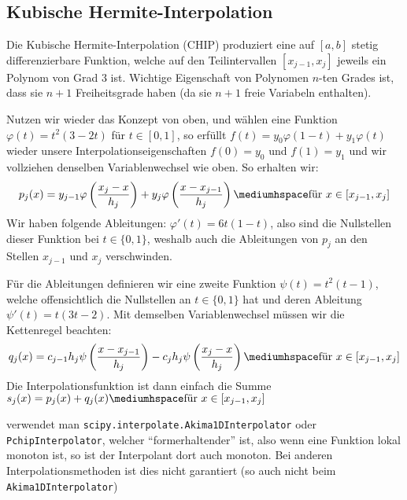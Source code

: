 
\subsection{Kubische Hermite-Interpolation}
Die Kubische Hermite-Interpolation (CHIP) produziert eine auf $[a, b]$ stetig differenzierbare Funktion, welche auf den Teilintervallen $[x_{j - 1}, x_j]$ jeweils ein Polynom von Grad 3 ist.
Wichtige Eigenschaft von Polynomen $n$-ten Grades ist, dass sie $n + 1$ Freiheitsgrade haben (da sie $n + 1$ freie Variabeln enthalten).

Nutzen wir wieder das Konzept von oben, und wählen eine Funktion $\varphi(t) = t^2(3 - 2t)$ für $t \in [0, 1]$,
so erfüllt $f(t) = y_0\varphi(1 - t) + y_1 \varphi(t)$ wieder unsere Interpolationseigenschaften $f(0) = y_0$ und $f(1) = y_1$ und wir vollziehen denselben Variablenwechsel wie oben.
So erhalten wir:
\begin{align*}
    p_j(x) = y_{j - 1} \varphi \left( \frac{x_j - x}{h_j} \right) + y_j \varphi \left( \frac{x - x_{j - 1}}{h_j} \right) \mediumhspace \text{für } x \in [x_{j - 1}, x_j]
\end{align*}
Wir haben folgende Ableitungen: $\varphi'(t) = 6t(1 - t)$, also sind die Nullstellen dieser Funktion bei $t \in \{ 0, 1 \}$,
weshalb auch die Ableitungen von $p_j$ an den Stellen $x_{j - 1}$ und $x_j$ verschwinden.

Für die Ableitungen definieren wir eine zweite Funktion $\psi(t) = t^2(t - 1)$, welche offensichtlich die Nullstellen an $t \in \{ 0, 1 \}$ hat
und deren Ableitung $\psi'(t) = t(3t - 2)$. Mit demselben Variablenwechsel müssen wir die Kettenregel beachten:
\begin{align*}
    q_j(x) = c_{j - 1} h_j \psi \left( \frac{x - x_{j - 1}}{h_j} \right) - c_j h_j \psi \left( \frac{x_j - x}{h_j} \right) \mediumhspace \text{für } x \in [x_{j - 1}, x_j]
\end{align*}
Die Interpolationsfunktion ist dann einfach die Summe $s_j(x) = p_j(x) + q_j(x) \mediumhspace \text{für } x \in [x_{j - 1}, x_j]$

\innumpy verwendet man \texttt{scipy.interpolate.Akima1DInterpolator} oder \texttt{PchipInterpolator}, welcher ``formerhaltender'' ist,
also wenn eine Funktion lokal monoton ist, so ist der Interpolant dort auch monoton.
Bei anderen Interpolationsmethoden ist dies nicht garantiert (so auch nicht beim \texttt{Akima1DInterpolator})

